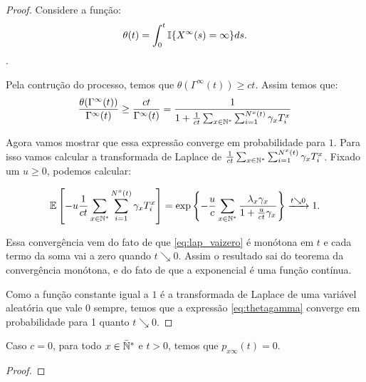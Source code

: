 \begin{proof}
  Considere a função:
  \begin{displaymath}
    \theta(t) = \int_0^t {\mathbb{I}} \{ X^\infty (s) = \infty \} ds.
  \end{displaymath}.
  
  Pela contrução do processo, temos que $\theta(\Gamma^\infty(t)) \geq c
  t$. Assim temos que:
  \begin{equation}
    \label{eq:thetagamma}
    \frac{\theta (\Gamma^\infty(t))}{\Gamma^\infty (t)} \geq
    \frac{c t}{\Gamma^\infty(t)} =
    \frac{1}{1 + \frac{1}{ct} \sum_{x \in {\mathbb{N^*}}} \sum_{i = 1}^{N^x(t)}
      \gamma_x T^x_i}
  \end{equation}
  
  Agora vamos mostrar que essa expressão converge em probabilidade
  para $1$. Para isso vamos calcular a transformada de Laplace de
  $\frac{1}{ct} \sum_{x \in {\mathbb{N^*}}} \sum_{i = 1}^{N^x(t)} \gamma_x
  T^x_i$. Fixado um $u \geq 0$, podemos calcular:

  \begin{equation}
    \label{eq:lap_vaizero}
    {\mathbb{E}} \left[
      -u \frac{1}{ct} \sum_{x \in {\mathbb{N^*}}} \sum_{i=1}^{N^x(t)} \gamma_x T^x_i
    \right] =
    \exp \left\{
      - \frac{u}{c} \sum_{x \in {\mathbb{N^*}}}  \frac{\lambda_x \gamma_x}{1 +
        \frac{u}{ct}\gamma_x}
    \right\} \xrightarrow{t \searrow 0} 1.
  \end{equation}
  
  Essa convergência vem do fato de que \ref{eq:lap_vaizero} é monótona
  em $t$ e cada termo da soma vai a zero quando $t \searrow 0$.  Assim
  o resultado sai do teorema da convergência monótona, e do fato de
  que a exponencial é uma função contínua.

  Como a função constante igual a $1$ é a transformada de Laplace de
  uma variável aleatória que vale $0$ sempre, temos que a expressão
  \ref{eq:thetagamma} converge em probabilidade para 1 quanto $t
  \searrow 0$.




\end{proof}

\begin{proposicao}
  \label{prop:naocontinuidade}
  Caso $c = 0$, para todo $x \in {\mathbb{\bar{N}^*}}$ e $t > 0$, temos que $p_{x
    \infty} (t) = 0$.
\end{proposicao}
\begin{proof}
\end{proof}


